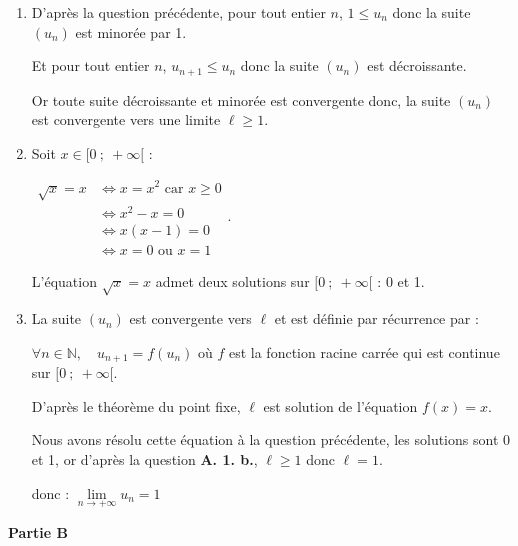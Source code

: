 \documentclass[10pt]{article}
\providecommand{\N}{\mathbb{N}}
\begin{document}
\begin{enumerate}
\begin{enumerate}
\emph{Conclusion :} L'affirmation $P_0$ est vraie, et, pour tout entier naturel non nul $n$, la véracité de l'affirmation est héréditaire : d'après le principe de récurrence, on en déduit que pour tout entier naturel non nul $n$, on a : $1 \leqslant u_{n+1} \leqslant u_{n}$.
	\item D'après la question précédente, pour tout entier $n$, $1\leqslant u_n$ donc la suite $\left(u_n\right)$ est minorée par 1.

Et pour tout entier $n$, $u_{n+1}\leqslant u_n$ donc la suite $\left( u_n\right)$ est décroissante.

Or toute suite décroissante et minorée est convergente donc, la suite $\left( u_n\right)$ est convergente vers une limite $\ell \geqslant 1$.
	\item Soit $x \in [0~;~+\infty[$ :

$\begin{aligned}\sqrt{x} =x &\iff x =x^2 \text { car }x\geqslant 0 \\
	&\iff x^2-x=0\\
	& \iff x(x-1)=0\\
	&\iff x=0 \text{ ou } x=1
\end{aligned}$.

L'équation $\sqrt{x}=x$ admet deux solutions sur $[0~;~+\infty[$ : 0 et 1.
	\item La suite $\left(u_{n}\right)$ est convergente vers $\ell$ et est définie par récurrence par :

$\forall n \in \N, \quad u_{n+1}=f(u_n)$ \quad où  $f$ est la fonction racine carrée qui est continue sur $[0~;~+\infty[$.

D'après le théorème du point fixe, $\ell$ est solution de l'équation $f(x) = x$.

Nous avons résolu cette équation à la question précédente, les solutions sont 0 et 1, or d'après la question \textbf{A. 1. b.}, $\ell \geqslant 1$ donc $\ell =1$.

donc : $\lim\limits_{n\to +\infty} u_n = 1$
	\end{enumerate}
\end{enumerate}

\medskip

\textbf{Partie B}

\medskip
\end{document}
